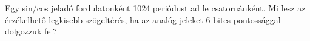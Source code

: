 \begin{example}

Egy sin/cos jeladó fordulatonként 1024 periódust ad le csatornánként. Mi lesz az érzékelhető legkisebb szögeltérés, ha az analóg jeleket 6 bites pontossággal dolgozzuk fel?

\tcbline
\vspace{1mm}

\solution

\end{example}